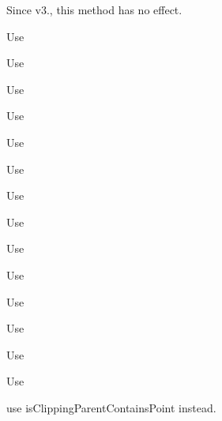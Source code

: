 \begin{DoxyRefList}
Since v3., this method has no effect.  
\item[\label{deprecated__deprecated000155}%
\Hypertarget{deprecated__deprecated000155}%
Member \hyperlink{classui_1_1Scale9Sprite_ac7989890a826ab703510c852f87e9ebe}{ui\+:\+:Scale9\+Sprite\+:\+:C\+C\+\_\+\+D\+E\+P\+R\+E\+C\+A\+T\+ED} (v3) virtual bool init\+With\+Batch\+Node(\hyperlink{classSpriteBatchNode}{Sprite\+Batch\+Node} $\ast$batchnode]Use

Use

Use

Use 
\item[\label{deprecated__deprecated000157}%
\Hypertarget{deprecated__deprecated000157}%
Member \hyperlink{classui_1_1Scale9Sprite_a88772a231a9cf4f4acfa08e745dc560f}{ui\+:\+:Scale9\+Sprite\+:\+:C\+C\+\_\+\+D\+E\+P\+R\+E\+C\+A\+T\+ED} (v3) bool update\+With\+Batch\+Node(\hyperlink{classSpriteBatchNode}{Sprite\+Batch\+Node} $\ast$batchnode]Use

Use 
\item[\label{deprecated__deprecated000160}%
\Hypertarget{deprecated__deprecated000160}%
Member \hyperlink{classui_1_1ScrollView_accb739c82acfb7dd0db5a33f68519356}{ui\+:\+:Scroll\+View\+:\+:add\+Event\+Listener\+Scroll\+View} (\hyperlink{classRef}{Ref} $\ast$target, S\+E\+L\+\_\+\+Scroll\+View\+Event selector)]Use

Use 
\item[\label{deprecated__deprecated000165}%
\Hypertarget{deprecated__deprecated000165}%
Member \hyperlink{classui_1_1TextField_af2e6a186536b2e90b37780255f181a95}{ui\+:\+:Text\+Field\+:\+:add\+Event\+Listener\+Text\+Field} (\hyperlink{classRef}{Ref} $\ast$target, S\+E\+L\+\_\+\+Text\+Field\+Event selector)]Use

Use 
\item[\label{deprecated__deprecated000164}%
\Hypertarget{deprecated__deprecated000164}%
Member \hyperlink{classui_1_1TextField_afc22b95a00cce564179260e456ad9ff3}{ui\+:\+:Text\+Field\+:\+:get\+String\+Value} () const]Use

Use 
\item[\label{deprecated__deprecated000163}%
\Hypertarget{deprecated__deprecated000163}%
Member \hyperlink{classui_1_1TextField_adcd37c99947c549a77ffbd3389e176b3}{ui\+:\+:Text\+Field\+:\+:set\+Text} (const std\+::string \&text)]Use

Use 
\item[\label{deprecated__deprecated000176}%
\Hypertarget{deprecated__deprecated000176}%
Member \hyperlink{classui_1_1Widget_a6ec279041bfbb56c145ba69471cfef9b}{ui\+:\+:Widget\+:\+:clipping\+Parent\+Area\+Contain\+Point} (const \hyperlink{classVec2}{Vec2} \&pt)]use {\ttfamily is\+Clipping\+Parent\+Contains\+Point} instead. 


\end{DoxyRefList}
